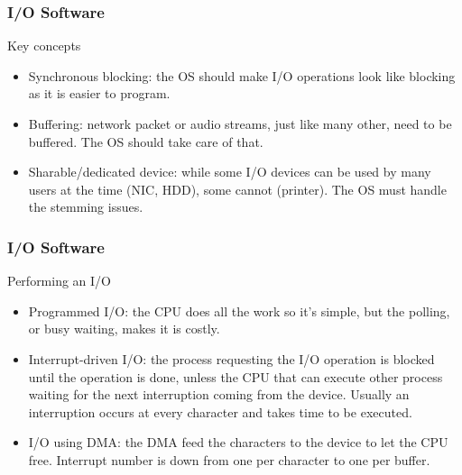 \begin{frame}
  \frametitle{I/O Software}
  \begin{block}{Key concepts}
    \begin{itemize}
      \item Synchronous blocking: the OS should make I/O operations look like blocking as it is easier to program.
      \item Buffering: network packet or audio streams, just like many other, need to be buffered. The OS should take care of that.
      \item Sharable/dedicated device: while some I/O devices can be used by many users at the time (NIC, HDD), some cannot (printer). The OS must handle the stemming issues.
    \end{itemize}
  \end{block}
\end{frame}

\begin{frame}
  \frametitle{I/O Software}
  \begin{block}{Performing an I/O}
    \begin{itemize}
      \item Programmed I/O: the CPU does all the work so it's simple, but the polling, or busy waiting, makes it is costly.
      \item Interrupt-driven I/O: the process requesting the I/O operation is blocked until the operation is done, unless the CPU that can execute other process waiting for the next interruption coming from the device. Usually an interruption occurs at every character and takes time to be executed.
      \item I/O using DMA: the DMA feed the characters to the device to let the CPU free. Interrupt number is down from one per character to one per buffer.
    \end{itemize}
  \end{block}
\end{frame}
